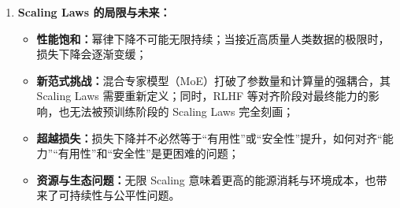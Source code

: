 \documentclass[../main.tex]{subfiles}
\begin{document}
\begin{enumerate}
    \textbf{Chinchilla 的连锁反应：}数据成为新瓶颈、推动数据工程、催生合成数据：

    \item \textbf{Scaling Laws 的局限与未来：}
    \begin{itemize}
        \item \textbf{性能饱和：}幂律下降不可能无限持续；当接近高质量人类数据的极限时，损失下降会逐渐变缓；
        \item \textbf{新范式挑战：}混合专家模型（MoE）打破了参数量和计算量的强耦合，其 Scaling Laws 需要重新定义；同时，RLHF 等对齐阶段对最终能力的影响，也无法被预训练阶段的 Scaling Laws 完全刻画；
        \item \textbf{超越损失：}损失下降并不必然等于“有用性”或“安全性”提升，如何对齐“能力”“有用性”和“安全性”是更困难的问题；
        \item \textbf{资源与生态问题：}无限 Scaling 意味着更高的能源消耗与环境成本，也带来了可持续性与公平性问题。
    \end{itemize}
\end{enumerate}
\end{document}
